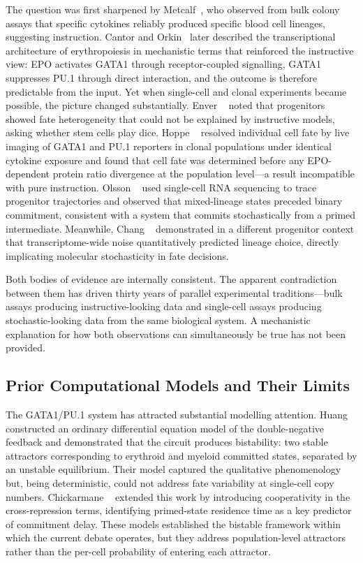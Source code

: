 The question was first sharpened by Metcalf~\cite{metcalf1988}, who observed
from bulk colony assays that specific cytokines reliably produced specific blood
cell lineages, suggesting instruction. Cantor and Orkin~\cite{cantor2002} later
described the transcriptional architecture of erythropoiesis in mechanistic terms
that reinforced the instructive view: EPO activates GATA1 through
receptor-coupled signalling, GATA1 suppresses PU.1 through direct interaction,
and the outcome is therefore predictable from the input. Yet when single-cell and
clonal experiments became possible, the picture changed substantially. Enver
\etal~\cite{enver1998} noted that progenitors showed fate heterogeneity that
could not be explained by instructive models, asking whether stem cells play
dice. Hoppe \etal~\cite{hoppe2016} resolved individual cell fate by live imaging
of GATA1 and PU.1 reporters in clonal populations under identical cytokine
exposure and found that cell fate was determined before any EPO-dependent protein
ratio divergence at the population level---a result incompatible with pure
instruction. Olsson \etal~\cite{olsson2016} used single-cell RNA sequencing to
trace progenitor trajectories and observed that mixed-lineage states preceded
binary commitment, consistent with a system that commits stochastically from a
primed intermediate. Meanwhile, Chang \etal~\cite{chang2008} demonstrated in a
different progenitor context that transcriptome-wide noise quantitatively
predicted lineage choice, directly implicating molecular stochasticity in fate
decisions.

Both bodies of evidence are internally consistent. The apparent contradiction
between them has driven thirty years of parallel experimental traditions---bulk
assays producing instructive-looking data and single-cell assays producing
stochastic-looking data from the same biological system. A mechanistic
explanation for how both observations can simultaneously be true has not been
provided.

\subsection{Prior Computational Models and Their Limits}

The GATA1/PU.1 system has attracted substantial modelling attention. Huang
\etal~\cite{huang2007} constructed an ordinary differential equation model of the
double-negative feedback and demonstrated that the circuit produces bistability:
two stable attractors corresponding to erythroid and myeloid committed states,
separated by an unstable equilibrium. Their model captured the qualitative
phenomenology but, being deterministic, could not address fate variability at
single-cell copy numbers. Chickarmane \etal~\cite{chickarmane2009} extended this
work by introducing cooperativity in the cross-repression terms, identifying
primed-state residence time as a key predictor of commitment delay. These models
established the bistable framework within which the current debate operates, but
they address population-level attractors rather than the per-cell probability of
entering each attractor.

